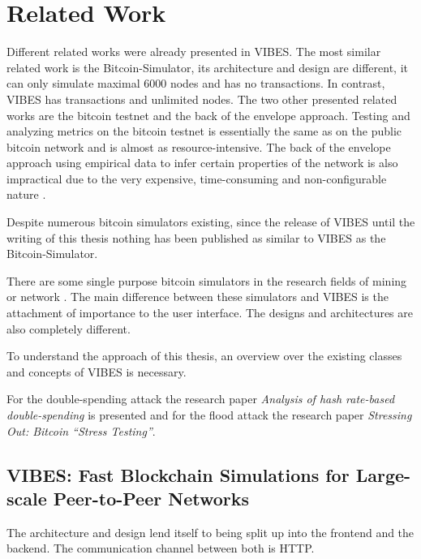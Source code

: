 \chapter{Related Work}
\label{chapter:relatedWork}
Different related works were already presented in VIBES. The most similar related work is the Bitcoin-Simulator, its architecture and design are different, it can only simulate maximal 6000 nodes and has no transactions. In contrast, VIBES has transactions and unlimited nodes. The two other presented related works are the bitcoin testnet and the back of the envelope approach. Testing and analyzing metrics on the bitcoin testnet is essentially the same as on the public bitcoin network and is almost as resource-intensive. The back of the envelope approach using empirical data to infer certain properties of the network is also impractical due to the very expensive, time-consuming and non-configurable nature \cite{vibes}.

Despite numerous bitcoin simulators existing, since the release of VIBES until the writing of this thesis nothing has been published as similar to VIBES as the Bitcoin-Simulator.

There are some single purpose bitcoin simulators in the research fields of mining \cite{Carlsten:2016:IBW:2976749.2978408} or network \cite{DBLP:conf/im/NeudeckerAH15} \cite{sarrias2015}. The main difference between these simulators and VIBES is the attachment of importance to the user interface. The designs and architectures are also completely different.

To understand the approach of this thesis, an overview over the existing classes and concepts of VIBES is necessary.

For the double-spending attack the research paper  \textit{Analysis of hash rate-based double-spending} is presented and for the flood attack the research paper \textit{Stressing Out: Bitcoin “Stress Testing”}.

\section{VIBES: Fast Blockchain Simulations for Large-scale Peer-to-Peer Networks}
The architecture and design lend itself to being split up into the frontend and the backend. The communication channel between both is HTTP.

